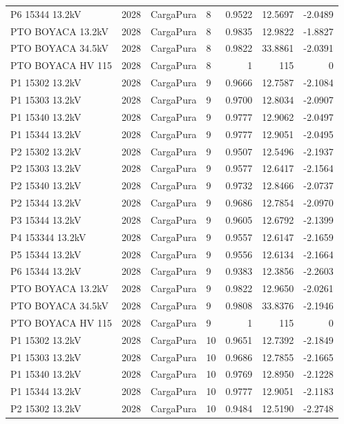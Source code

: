 \documentclass[11pt,a4paper]{article}
\begin{document}
\begin{longtable}{llllrrr}
P6 15344 13.2kV & 2028 & CargaPura & 8 & 0.9522 & 12.5697 & -2.0489 \\
PTO BOYACA 13.2kV & 2028 & CargaPura & 8 & 0.9835 & 12.9822 & -1.8827 \\
PTO BOYACA 34.5kV & 2028 & CargaPura & 8 & 0.9822 & 33.8861 & -2.0391 \\
PTO BOYACA HV 115 & 2028 & CargaPura & 8 & 1 & 115 & 0 \\
P1 15302 13.2kV & 2028 & CargaPura & 9 & 0.9666 & 12.7587 & -2.1084 \\
P1 15303 13.2kV & 2028 & CargaPura & 9 & 0.9700 & 12.8034 & -2.0907 \\
P1 15340 13.2kV & 2028 & CargaPura & 9 & 0.9777 & 12.9062 & -2.0497 \\
P1 15344 13.2kV & 2028 & CargaPura & 9 & 0.9777 & 12.9051 & -2.0495 \\
P2 15302 13.2kV & 2028 & CargaPura & 9 & 0.9507 & 12.5496 & -2.1937 \\
P2 15303 13.2kV & 2028 & CargaPura & 9 & 0.9577 & 12.6417 & -2.1564 \\
P2 15340 13.2kV & 2028 & CargaPura & 9 & 0.9732 & 12.8466 & -2.0737 \\
P2 15344 13.2kV & 2028 & CargaPura & 9 & 0.9686 & 12.7854 & -2.0970 \\
P3 15344 13.2kV & 2028 & CargaPura & 9 & 0.9605 & 12.6792 & -2.1399 \\
P4 153344 13.2kV & 2028 & CargaPura & 9 & 0.9557 & 12.6147 & -2.1659 \\
P5 15344 13.2kV & 2028 & CargaPura & 9 & 0.9556 & 12.6134 & -2.1664 \\
P6 15344 13.2kV & 2028 & CargaPura & 9 & 0.9383 & 12.3856 & -2.2603 \\
PTO BOYACA 13.2kV & 2028 & CargaPura & 9 & 0.9822 & 12.9650 & -2.0261 \\
PTO BOYACA 34.5kV & 2028 & CargaPura & 9 & 0.9808 & 33.8376 & -2.1946 \\
PTO BOYACA HV 115 & 2028 & CargaPura & 9 & 1 & 115 & 0 \\
P1 15302 13.2kV & 2028 & CargaPura & 10 & 0.9651 & 12.7392 & -2.1849 \\
P1 15303 13.2kV & 2028 & CargaPura & 10 & 0.9686 & 12.7855 & -2.1665 \\
P1 15340 13.2kV & 2028 & CargaPura & 10 & 0.9769 & 12.8950 & -2.1228 \\
P1 15344 13.2kV & 2028 & CargaPura & 10 & 0.9777 & 12.9051 & -2.1183 \\
P2 15302 13.2kV & 2028 & CargaPura & 10 & 0.9484 & 12.5190 & -2.2748 \\

\end{longtable}
\end{document}
